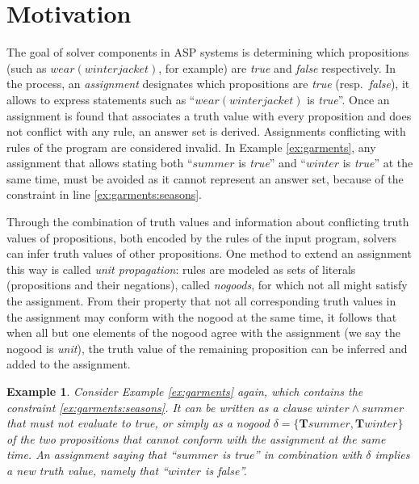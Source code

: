 \documentclass[final]{vutinfth} %
\newtheorem{example}{Example}[chapter]
\newcommand{\bT}{\mathbf{T}}
\begin{document}
\section{Motivation}
\label{sec:motivation}

The goal of solver components in ASP systems is determining which propositions (such as $wear(winterjacket)$, for example) are \emph{true} and \emph{false} respectively. In the process, an \emph{assignment} designates which propositions are \emph{true} (resp.~\emph{false}), it allows to express statements such as \enquote{$wear(winterjacket)$ is \emph{true}}. Once an assignment is found that associates a truth value with every proposition and does not conflict with any rule, an answer set is derived. Assignments conflicting with rules of the program are considered invalid. In Example \ref{ex:garments}, any assignment that allows stating both \enquote{$summer$ is \emph{true}} and \enquote{$winter$ is \emph{true}} at the same time, must be avoided as it cannot represent an answer set, because of the constraint in line \ref{ex:garments:seasons}.

Through the combination of truth values and information about conflicting truth values of propositions, both encoded by the rules of the input program, solvers can infer truth values of other propositions. One method to extend an assignment this way is called \emph{unit propagation}: rules are modeled as sets of literals (propositions and their negations), called \emph{nogoods}, for which not all might satisfy the assignment. From their property that not all corresponding truth values in the assignment may conform with the nogood at the same time, it follows that when all but one elements of the nogood agree with the assignment (we say the nogood is \emph{unit}), the truth value of the remaining proposition can be inferred and added to the assignment.

\begin{example}
\label{ex:garmentprop}
Consider Example \ref{ex:garments} again, which contains the constraint \ref{ex:garments:seasons}. It can be written as a clause $winter \wedge summer$ that must not evaluate to \emph{true}, or simply as a nogood $\delta = \{ \bT summer, \bT winter \}$ of the two propositions that cannot conform with the assignment at the same time. An assignment saying that \enquote{$summer$ is \emph{true}} in combination with $\delta$ implies a new truth value, namely that \enquote{$winter$ is \emph{false}}.
\end{example}
\end{document}
